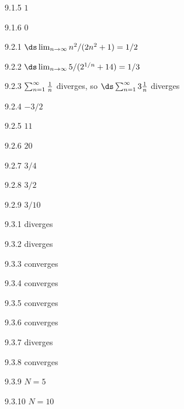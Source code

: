 \begin{Answer}{9.1.5}
$1$
\end{Answer}
\begin{Answer}{9.1.6}
$0$
\end{Answer}
\begin{Answer}{9.2.1}
$\ds\lim_{n\to\infty} n^2/(2n^2+1)=1/2$
\end{Answer}
\begin{Answer}{9.2.2}
$\ds\lim_{n\to\infty} 5/(2^{1/n}+14)=1/3$
\end{Answer}
\begin{Answer}{9.2.3}
$\sum_{n=1}^\infty {1\over n}$ diverges, so $\ds\sum_{n=1}^\infty 3{1\over n}$ diverges
\end{Answer}
\begin{Answer}{9.2.4}
$-3/2$
\end{Answer}
\begin{Answer}{9.2.5}
$11$
\end{Answer}
\begin{Answer}{9.2.6}
$20$
\end{Answer}
\begin{Answer}{9.2.7}
$3/4$
\end{Answer}
\begin{Answer}{9.2.8}
$3/2$
\end{Answer}
\begin{Answer}{9.2.9}
$3/10$
\end{Answer}
\begin{Answer}{9.3.1}
diverges
\end{Answer}
\begin{Answer}{9.3.2}
diverges
\end{Answer}
\begin{Answer}{9.3.3}
converges
\end{Answer}
\begin{Answer}{9.3.4}
converges
\end{Answer}
\begin{Answer}{9.3.5}
converges
\end{Answer}
\begin{Answer}{9.3.6}
converges
\end{Answer}
\begin{Answer}{9.3.7}
diverges
\end{Answer}
\begin{Answer}{9.3.8}
converges
\end{Answer}
\begin{Answer}{9.3.9}
$N=5$
\end{Answer}
\begin{Answer}{9.3.10}
$N=10$
\end{Answer}
